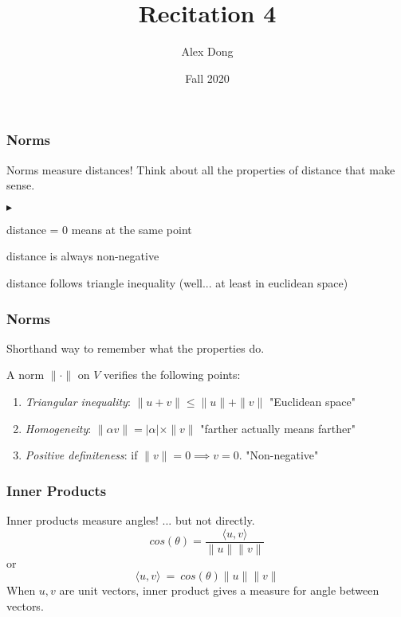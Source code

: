 \documentclass{beamer}
\title{Recitation 4}
\author{Alex Dong}
\institute{CDS, NYU}
\date{Fall 2020}
\renewenvironment{itemize}
\renewenvironment{enumerate}%
{\begin{list}{\arabic{enumi}.}%
      {\setlength{\leftmargin}{2.5em}%
       \setlength{\itemsep}{-\parsep}%
       \setlength{\topsep}{-\parskip}%
       \usecounter{enumi}}%
 }{\end{list}}
\renewenvironment{itemize}%
{\begin{list}{$\blacktriangleright$}%
      {\setlength{\leftmargin}{2.5em}%
       \setlength{\itemsep}{-\parsep}%
       \setlength{\topsep}{-\parskip}%
       \usecounter{enumi}}%
 }{\end{list}}
\begin{document}
\frame{\titlepage} 

\begin{frame}
\frametitle{Norms}
Norms measure distances!
Think about all the properties of distance that make sense.
\begin{itemize}
\item distance = 0 means at the same point
\item distance is always non-negative
\item distance follows triangle inequality (well... at least in euclidean space)
\end{itemize}

\end{frame}

\begin{frame}
\frametitle{Norms}
Shorthand way to remember what the properties do.
\begin{definition}[Norm]
	A norm $\| \cdot \|$ on $V$ verifies the following points:
	\begin{enumerate}
		\item \emph{Triangular inequality}: $\|u + v\| \leq \|u\| + \|v\|$ \hfill "Euclidean space"
		\item \emph{Homogeneity}: $\| \alpha v \| = |\alpha|\times \| v\|$ \hfill "farther actually means farther"
		\item \emph{Positive definiteness}: if $\|v\| = 0 \implies v=0$. \hfill "Non-negative"
	\end{enumerate}
\end{definition}
\end{frame}

\begin{frame}
\frametitle{Inner Products}
Inner products measure angles! 
... but not directly.
$$cos(\theta) = \frac{ \langle u,v \rangle }{\|u\| \|v\|}$$
or
$$ \langle u,v \rangle \ =\ cos(\theta) \|u\|\|v\|$$
When $u,v$ are unit vectors, inner product gives a measure for angle between vectors.
\end{frame}
\end{document}

